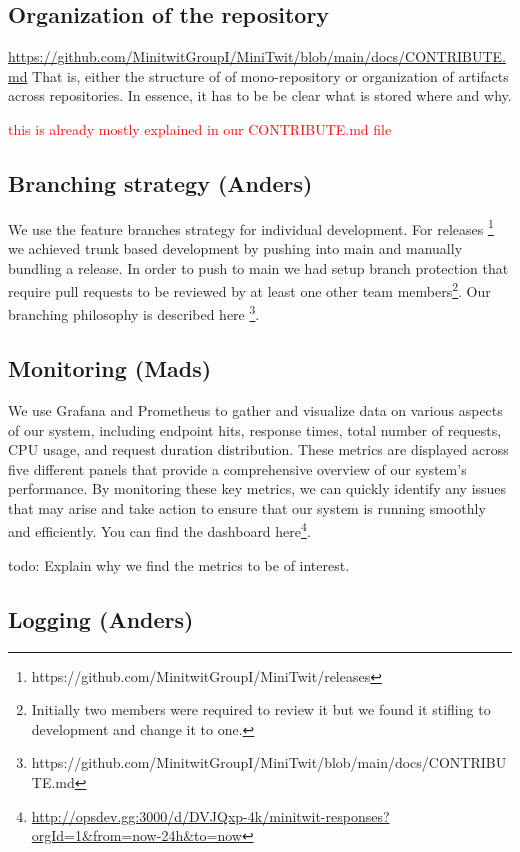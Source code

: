 \documentclass{article}
\begin{document}
\subsection{Organization of the repository}

\url{https://github.com/MinitwitGroupI/MiniTwit/blob/main/docs/CONTRIBUTE.md}
That is, either the structure of of mono-repository or organization of artifacts across repositories.
In essence, it has to be be clear what is stored where and why.

\textcolor{red}{this is already mostly explained in our CONTRIBUTE.md file}

\subsection{Branching strategy (Anders)}

We use the feature branches strategy for individual development. For releases \footnote{https://github.com/MinitwitGroupI/MiniTwit/releases} we achieved trunk based development by pushing into main and manually bundling a release. In order to push to main we had setup branch protection that require pull requests to be reviewed by at least one other team members\footnote{Initially two members were required to review it but we found it stifling to development and change it to one.}. Our branching philosophy is described here \footnote{https://github.com/MinitwitGroupI/MiniTwit/blob/main/docs/CONTRIBUTE.md}.

\subsection{Monitoring (Mads)}
We use Grafana and Prometheus to gather and visualize data on various aspects of our system, including endpoint hits, response times, total number of requests, CPU usage, and request duration distribution. These metrics are displayed across five different panels that provide a comprehensive overview of our system's performance. By monitoring these key metrics, we can quickly identify any issues that may arise and take action to ensure that our system is running smoothly and efficiently. You can find the dashboard here\footnote{\url{http://opsdev.gg:3000/d/DVJQxp-4k/minitwit-responses?orgId=1&from=now-24h&to=now}}.

todo: Explain why we find the metrics to be of interest.

\subsection{Logging (Anders)}
\end{document}
